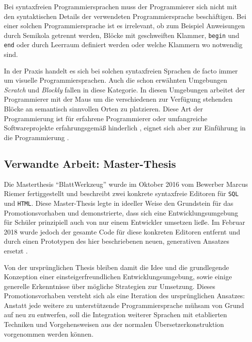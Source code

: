 \documentclass[paper=a4,fontsize=11pt,parskip=half]{scrartcl}
\begin{document}
Bei syntaxfreien Programmiersprachen muss der Programmierer sich nicht mit den syntaktischen Details der verwendeten Programmiersprache beschäftigen. Bei einer solchen Programmiersprache ist es irrelevant, ob zum Beispiel Anweisungen durch Semikola getrennt werden, Blöcke mit geschweiften Klammer, \texttt{begin} und \texttt{end} oder durch Leerraum definiert werden oder welche Klammern wo notwendig sind.

In der Praxis handelt es sich bei solchen syntaxfreien Sprachen de facto immer um visuelle Programmiersprachen. Auch die schon erwähnten Umgebungen \textit{Scratch} und \textit{Blockly} fallen in diese Kategorie. In diesen Umgebungen arbeitet der Programmierer mit der Maus um die verschiedenen zur Verfügung stehenden Blöcke an semantisch sinnvollen Orten zu platzieren. Diese Art der Programmierung ist für erfahrene Programmierer oder umfangreiche Softwareprojekte erfahrungsgemäß hinderlich \cite[S. 262f]{schiffer_visuelle_2001}, eignet sich aber zur Einführung in die Programmierung \cite{resnick_scratch:_2009}.

\subsection{Verwandte Arbeit: Master-Thesis}

Die Masterthesis \enquote{BlattWerkzeug} \cite{riemer_blattwerkzeug_2016}  wurde im Oktober 2016 vom Bewerber Marcus Riemer fertiggestellt und beschreibt zwei konkrete syntaxfreie Editoren für \texttt{SQL} und \texttt{HTML}. Diese Master-Thesis legte in ideeller Weise den Grundstein für das Promotionsvorhaben und demonstrierte, dass sich eine Entwicklungsumgebung für Schüler prinzipiell auch von nur einem Entwickler umsetzen ließe. Im Februar 2018 wurde jedoch der gesamte Code für diese konkreten Editoren entfernt und durch einen Prototypen des hier beschriebenen neuen, generativen Ansatzes ersetzt \cite{riemer_commit_2018}.

Von der ursprünglichen Thesis bleiben damit die Idee und die grundlegende Konzeption einer einsteigerfreundlichen Entwicklungsumgebung, sowie einige generelle Erkenntnisse über mögliche Strategien zur Umsetzung. Dieses Promotionsvorhaben versteht sich als eine Iteration des ursprünglichen Ansatzes: Anstatt jede weitere zu unterstützende Programmiersprache mühsam von Grund auf neu zu entwerfen, soll die Integration weiterer Sprachen mit etablierten Techniken und Vorgehensweisen aus der normalen Übersetzerkonstruktion vorgenommen werden können.
\end{document}
